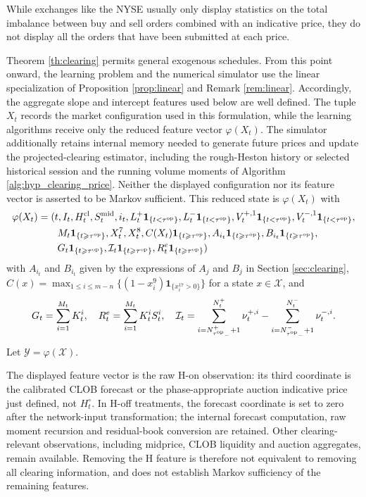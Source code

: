\documentclass[11pt]{article}
\begin{document}
\begin{remark}
    While exchanges like the NYSE usually only display statistics on the total imbalance between buy and sell orders combined with an indicative price, they do not display all the orders that have been submitted at each price.
\end{remark}

Theorem \ref{th:clearing} permits general exogenous schedules. From this point onward, the learning problem and the numerical simulator use the linear specialization of Proposition \ref{prop:linear} and Remark \ref{rem:linear}. Accordingly, the aggregate slope and intercept features used below are well defined. The tuple $X_t$ records the market configuration used in this formulation, while the learning algorithms receive only the reduced feature vector $\varphi(X_t)$. The simulator additionally retains internal memory needed to generate future prices and update the projected-clearing estimator, including the rough-Heston history or selected historical session and the running volume moments of Algorithm \ref{alg:hyp_clearing_price}. Neither the displayed configuration nor its feature vector is asserted to be Markov sufficient. This reduced state is $\varphi(X_t)$ with
\begin{align*}
    \varphi(X_t)&= (t,I_t, H_t^{\mathrm{cl}},S_t^\mathrm{mid},i_t, L_t^+\mathbf{1}_{\{t < \tau^{\mathrm{op}}\}}, L_t^-\mathbf{1}_{\{t < \tau^{\mathrm{op}}\}}, V_t^{+,1}\mathbf{1}_{\{t < \tau^{\mathrm{op}}\}}, V_t^{-,1}\mathbf{1}_{\{t < \tau^{\mathrm{op}}\}},\\
    &\qquad M_t\mathbf{1}_{\{t \geqslant \tau^{\mathrm{op}}\}}, {X_t^7}, {X_t^8}, C(X_t)\mathbf{1}_{\{t \geqslant \tau^{\mathrm{op}}\}}, A_{i_t}\mathbf{1}_{\{t \geqslant \tau^{\mathrm{op}}\}}, B_{i_t}\mathbf{1}_{\{t \geqslant \tau^{\mathrm{op}}\}}, \\
    &\qquad G_t\mathbf{1}_{\{t \geqslant \tau^{\mathrm{op}}\}}, \mathcal{I}_t \mathbf{1}_{\{t \geqslant \tau^{\mathrm{op}}\}}, {R_t^e}\mathbf{1}_{\{t \geqslant \tau^{\mathrm{op}}\}})
\end{align*}
with $A_{i_t}$ and $B_{i_t}$ given  by the expressions of $A_j$ and $B_j$ in Section \ref{sec:clearing}, $C(x) = \max_{1 \leqslant i \leqslant m-n}\{(1-x^9_i)\mathbf{1}_{\{x_i^{17}>0\}}\}$ for a state $x\in \mathcal{X}$, and
\[G_t = \sum_{i=1}^{M_t} K_t^i, \quad {R_t^e} = \sum_{i=1}^{M_t} K_t^i S_t^i, \quad \mathcal{I}_t = \sum_{i={N_{{\tau^{\mathrm{op}}}_-}^++1}}^{N_t^+} \nu_t^{+,i}-\sum_{i={N_{{\tau^{\mathrm{op}}}_-}^-+1}}^{N_t^-} \nu_t^{-,i}.\]
Let $\mathcal{Y} = \varphi(\mathcal{X})$.

{The displayed feature vector is the raw H-on observation: its third coordinate is the calibrated CLOB forecast or the phase-appropriate auction indicative price just defined, not $H_t^\circ$. In H-off treatments, the forecast coordinate is set to zero after the network-input transformation; the internal forecast computation, raw moment recursion and residual-book conversion are retained. Other clearing-relevant observations, including midprice, CLOB liquidity and auction aggregates, remain available. Removing the H feature is therefore not equivalent to removing all clearing information, and does not establish Markov sufficiency of the remaining features.}
\end{document}
